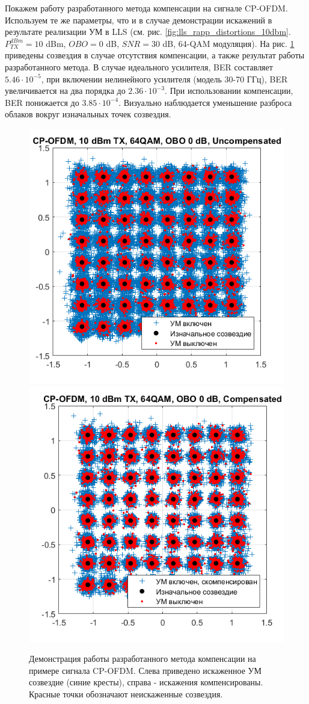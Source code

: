 Покажем работу разработанного метода компенсации на сигнале CP-OFDM.
Используем те же параметры, что и в случае демонстрации искажений в
результате реализации УМ в LLS (см. рис.
\ref{fig:lls_rapp_distortions_10dbm}. $P^{dBm}_{TX} = 10$ dBm, $OBO = 0$
dB, $SNR=30$ dB, 64-QAM модуляция). На рис.
\ref{fig:ofdm_lls_compensation_10dbm} приведены созвездия в случае
отсутствия компенсации, а также результат работы разработанного метода.
В случае идеального усилителя, BER составляет $5.46\cdot 10^{-5}$, при включении
нелинейного усилителя (модель 30-70 ГГц), BER увеличивается на два порядка
до $2.36\cdot 10^{-3}$. При использовании компенсации, BER понижается до
$3.85\cdot 10^{-4}$. Визуально наблюдается уменьшение разброса облаков
вокруг изначальных точек созвездия.

\begin{figure}[h!]
    \centering
    \includegraphics[width=0.45\linewidth]{figs/ofdm_pa_on_obo0_TX10_noPN2.png}
    \includegraphics[width=0.45\linewidth]{figs/ofdm_pa_on_comp_obo0_TX10_noPN.png}
    \caption{Демонстрация работы разработанного метода компенсации на
    примере сигнала CP-OFDM. Слева приведено искаженное УМ созвездие (синие
    кресты), справа - искажения компенсированы. Красные точки обозначают
    неискаженные созвездия.}
    \label{fig:ofdm_lls_compensation_10dbm}
\end{figure}





